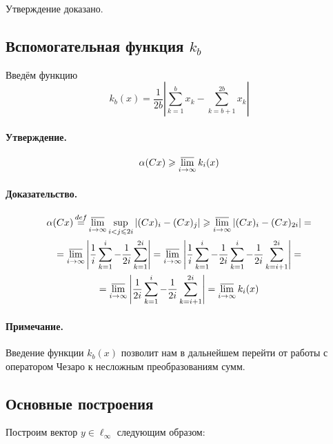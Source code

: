 Утверждение доказано.

\subsection{Вспомогательная функция $k_b$}

Введём функцию
\begin{equation}\label{def_k_b}
	k_b(x) = \frac{1}{2b}\left|
		\sum_{k=1}^{b}x_k - \sum_{k=b+1}^{2b}x_k
	\right|
\end{equation}

\paragraph{Утверждение.}
\begin{equation}\label{alpha_greater_k_b}
	\alpha (Cx) \geq \varlimsup_{i\to \infty} k_i(x)
\end{equation}

\paragraph{Доказательство.}

\begin{multline*}
	\alpha (Cx) \mathop{=}\limits^{def}
	\varlimsup_{i\to \infty} \sup_{i<j\leq 2i} |(Cx)_i - (Cx)_j| \geq
	\varlimsup_{i\to \infty} |(Cx)_i - (Cx)_{2i}| =
	\\ =
	\varlimsup_{i\to \infty} \left|\frac{1}{i}\sum_{k=1}^i  - \frac{1}{2i}\sum_{k=1}^{2i} \right| =
	\varlimsup_{i\to \infty} \left|\frac{1}{i}\sum_{k=1}^i  - \frac{1}{2i}\sum_{k=1}^{i}- \frac{1}{2i}\sum_{k=i+1}^{2i}\right| =
	\\=
	\varlimsup_{i\to \infty} \left|\frac{1}{2i}\sum_{k=1}^i - \frac{1}{2i}\sum_{k=i+1}^{2i}\right| =
	\varlimsup_{i\to \infty} k_i(x)
\end{multline*}

\paragraph{Примечание.}
Введение функции $k_b(x)$ позволит нам в дальнейшем перейти от работы с оператором Чезаро
к несложным преобразованиям сумм.



\subsection{Основные построения}

Построим вектор $y\in \ell_\infty$ следующим образом:

